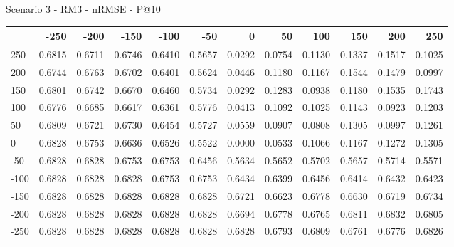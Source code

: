 Scenario 3 - RM3 - nRMSE - P@10
\begin{tabular}{lrrrrrrrrrrr}
\toprule
{} &   -250 &   -200 &   -150 &   -100 &   -50  &    0   &    50  &    100 &    150 &    200 &    250 \\
\midrule
 250 & 0.6815 & 0.6711 & 0.6746 & 0.6410 & 0.5657 & 0.0292 & 0.0754 & 0.1130 & 0.1337 & 0.1517 & 0.1025 \\
 200 & 0.6744 & 0.6763 & 0.6702 & 0.6401 & 0.5624 & 0.0446 & 0.1180 & 0.1167 & 0.1544 & 0.1479 & 0.0997 \\
 150 & 0.6801 & 0.6742 & 0.6670 & 0.6460 & 0.5734 & 0.0292 & 0.1283 & 0.0938 & 0.1180 & 0.1535 & 0.1743 \\
 100 & 0.6776 & 0.6685 & 0.6617 & 0.6361 & 0.5776 & 0.0413 & 0.1092 & 0.1025 & 0.1143 & 0.0923 & 0.1203 \\
 50  & 0.6809 & 0.6721 & 0.6730 & 0.6454 & 0.5727 & 0.0559 & 0.0907 & 0.0808 & 0.1305 & 0.0997 & 0.1261 \\
 0   & 0.6828 & 0.6753 & 0.6636 & 0.6526 & 0.5522 & 0.0000 & 0.0533 & 0.1066 & 0.1167 & 0.1272 & 0.1305 \\
-50  & 0.6828 & 0.6828 & 0.6753 & 0.6753 & 0.6456 & 0.5634 & 0.5652 & 0.5702 & 0.5657 & 0.5714 & 0.5571 \\
-100 & 0.6828 & 0.6828 & 0.6828 & 0.6753 & 0.6753 & 0.6434 & 0.6399 & 0.6456 & 0.6414 & 0.6432 & 0.6423 \\
-150 & 0.6828 & 0.6828 & 0.6828 & 0.6828 & 0.6828 & 0.6721 & 0.6623 & 0.6778 & 0.6630 & 0.6719 & 0.6734 \\
-200 & 0.6828 & 0.6828 & 0.6828 & 0.6828 & 0.6828 & 0.6694 & 0.6778 & 0.6765 & 0.6811 & 0.6832 & 0.6805 \\
-250 & 0.6828 & 0.6828 & 0.6828 & 0.6828 & 0.6828 & 0.6828 & 0.6793 & 0.6809 & 0.6761 & 0.6776 & 0.6826 \\
\bottomrule
\end{tabular}

